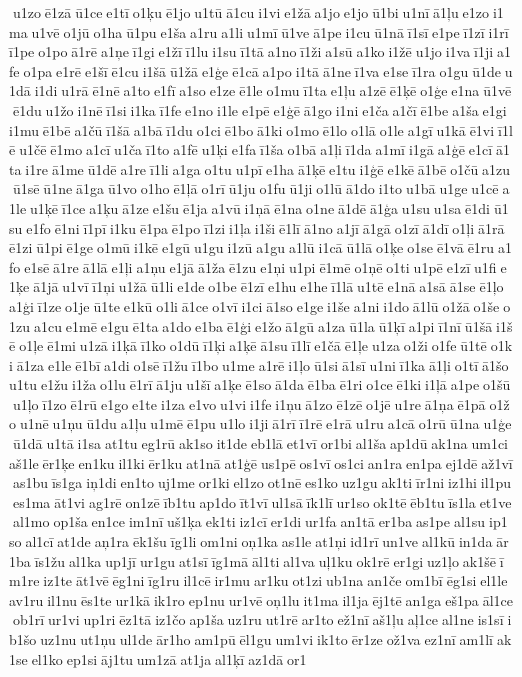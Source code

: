  u1zo ē1zā ū1ce e1tī o1ķu ē1jo u1tū ā1cu i1vi e1žā a1jo e1jo ū1bi u1nī ā1ļu e1zo i1ma u1vē o1jū o1ha ū1pu e1ša a1ru a1li u1mī ū1ve ā1pe i1cu ū1nā ī1sī e1pe ī1zī i1rī ī1pe o1po ā1rē a1ņe ī1gi e1žī ī1lu i1su ī1tā a1no ī1ži a1sū a1ko i1žē u1jo i1va ī1ji a1fe o1pa e1rē e1šī ē1cu i1šā ū1žā e1ģe ē1cā a1po i1tā ā1ne ī1va e1se ī1ra o1gu ū1de u1dā i1di u1rā ē1nē a1to e1fī a1so e1ze ē1le o1mu ī1ta e1ļu a1zē ē1ķē o1ģe e1na ū1vē ē1du u1žo i1nē ī1si i1ka ī1fe e1no i1le e1pē e1ģē ā1go i1ni e1ča a1čī ē1be a1ša e1gi i1mu ē1bē a1čū ī1šā a1bā ī1du o1ci ē1bo ā1ki o1mo ē1lo o1lā o1le a1gī u1kā ē1vi ī1lē u1čē ē1mo a1cī u1ča ī1to a1fē u1ķi e1fa ī1ša o1bā a1ļi ī1da a1mī i1gā a1ģē e1cī ā1ta i1re ā1me ū1dē a1re ī1li a1ga o1tu u1pī e1ha ā1ķē e1tu i1ģē e1kē ā1bē o1čū a1zu ū1sē ū1ne ā1ga ū1vo o1ho ē1ļā o1rī ū1ju o1fu ū1ji o1lū ā1do i1to u1bā u1ge u1cē a1le u1ķē ī1ce a1ķu ā1ze e1šu ē1ja a1vū i1ņā ē1na o1ne ā1dē ā1ģa u1su u1sa ē1di ū1su e1fo ē1ni ī1pī i1ku ē1pa ē1po ī1zi i1ļa i1ši ē1lī ā1no a1jī ā1gā o1zī ā1dī o1ļi ā1rā ē1zi ū1pi ē1ge o1mū i1kē e1gū u1gu i1zū a1gu a1lū i1cā ū1lā o1ķe o1se ē1vā ē1ru a1fo e1sē ā1re ā1lā e1ļi a1ņu e1jā ā1ža ē1zu e1ņi u1pi ē1mē o1ņē o1ti u1pē e1zī u1fi e1ķe ā1jā u1vī ī1ņi u1žā ū1li e1de o1be ē1zī e1hu e1he ī1lā u1tē e1nā a1sā ā1se ē1ļo a1ģi ī1ze o1je ū1te e1kū o1li ā1ce o1vī i1ci ā1so e1ge i1še a1ni i1do ā1lū o1žā o1še o1zu a1cu e1mē e1gu ē1ta a1do e1ba ē1ģi e1žo ā1gū a1za ū1la ū1ķī a1pi ī1nī ū1šā i1šē o1ļe ē1mi u1zā i1ķā ī1ko o1dū ī1ķi a1ķē ā1su ī1lī e1čā ē1ļe u1za o1ži o1fe ū1tē o1ki ā1za e1le ē1bī a1di o1sē ī1žu ī1bo u1me a1rē i1ļo ū1si ā1sī u1ni ī1ka ā1ļi o1tī ā1šo u1tu e1žu i1ža o1lu ē1rī ā1ju u1šī a1ķe ē1so ā1da ē1ba ē1ri o1ce ē1ki i1ļā a1pe o1šū u1ļo ī1zo ē1rū e1go e1te i1za e1vo u1vi i1fe i1ņu ā1zo ē1zē o1jē u1re ā1ņa ē1pā o1žo u1nē u1ņu ū1du a1ļu u1mē ē1pu u1lo i1ji ā1rī ī1rē e1rā u1ru a1cā o1rū ū1na u1ģe ū1dā u1tā i1sa at1tu eg1rū ak1so it1de eb1lā et1vī or1bi al1ša ap1dū ak1na um1ci aš1le ēr1ķe en1ku il1ki ēr1ku at1nā at1ģē us1pē os1vī os1ci an1ra en1pa ej1dē až1vī as1bu īs1ga iņ1di en1to uj1me or1ki el1zo ot1nē es1ko uz1gu ak1ti īr1ni iz1hi il1pu es1ma āt1vi ag1rē on1zē īb1tu ap1do īt1vī ul1sā īk1lī ur1so ok1tē ēb1tu īs1la et1ve al1mo op1ša en1ce im1nī uš1ķa ek1ti iz1cī er1di ur1fa an1tā er1ba as1pe al1su ip1so al1cī at1de aņ1ra ēk1šu īg1li om1ni oņ1ka as1le at1ņi id1rī un1ve al1kū in1da ār1ba īs1žu al1ka up1jī ur1gu at1sī īg1mā āl1ti al1va uļ1ku ok1rē er1gi uz1ļo ak1šē īm1re iz1te āt1vē ēg1ni īg1ru il1cē ir1mu ar1ku ot1zi ub1na an1če om1bī ēg1si el1le av1ru il1nu ēs1te ur1kā ik1ro ep1nu ur1vē oņ1lu it1ma il1ja ēj1tē an1ga eš1pa āl1ce ob1rī ur1vi up1ri ēz1tā iz1čo ap1ša uz1ru ut1rē ar1to ež1nī aš1ļu aļ1ce al1ne is1sī ib1šo uz1nu ut1ņu ul1de ār1ho am1pū ēl1gu um1vi ik1to ēr1ze ož1va ez1nī am1lī ak1se el1ko ep1si āj1tu um1zā at1ja al1ķī az1dā or1